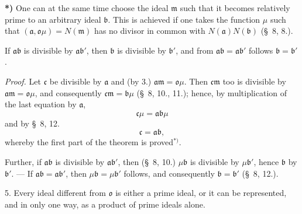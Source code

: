 \documentclass{article}
\begin{document}
\textbf{*)} One can at the same time choose the ideal $\mathfrak{m}$ such that it becomes relatively prime to an arbitrary ideal $\mathfrak{b}$. This is achieved if one takes the function $\mu$ such that $(\mathfrak{a}, \mathfrak{o}\mu) = N(\mathfrak{m})$ has no divisor in common with $N(\mathfrak{a})N(\mathfrak{b})$ (§~8, 8.).


If $\mathfrak{a}\mathfrak{b}$ is divisible by $\mathfrak{a}\mathfrak{b}'$, then $\mathfrak{b}$ is divisible by $\mathfrak{b}'$, and from $\mathfrak{a}\mathfrak{b} = \mathfrak{a}\mathfrak{b}'$ follows $\mathfrak{b} = \mathfrak{b}'$.

\emph{Proof.} Let $\mathfrak{c}$ be divisible by $\mathfrak{a}$ and (by 3.) $\mathfrak{a}\mathfrak{m} = \mathfrak{o}\mu$. Then $\mathfrak{c}\mathfrak{m}$ too is divisible by $\mathfrak{a}\mathfrak{m} = \mathfrak{o}\mu$, and consequently $\mathfrak{c}\mathfrak{m} = \mathfrak{b}\mu$ (§~8, 10., 11.); hence, by multiplication of the last equation by $\mathfrak{a}$,
\[ \mathfrak{c}\mu = \mathfrak{a}\mathfrak{b}\mu \]
and by §~8, 12.
\[ \mathfrak{c} = \mathfrak{a}\mathfrak{b}, \]
whereby the first part of the theorem is proved${}^{*)}$.

Further, if $\mathfrak{a}\mathfrak{b}$ is divisible by $\mathfrak{a}\mathfrak{b}'$, then (§~8, 10.) $\mu\mathfrak{b}$ is divisible by $\mu\mathfrak{b}'$, hence $\mathfrak{b}$ by $\mathfrak{b}'$. --- If $\mathfrak{a}\mathfrak{b} = \mathfrak{a}\mathfrak{b}'$, then $\mu\mathfrak{b} = \mu\mathfrak{b}'$ follows, and consequently $\mathfrak{b} = \mathfrak{b}'$ (§~8, 12.).

5. Every ideal different from $\mathfrak{o}$ is either a prime ideal, or it can be represented, and in only one way, as a product of prime ideals alone.
\end{document}
